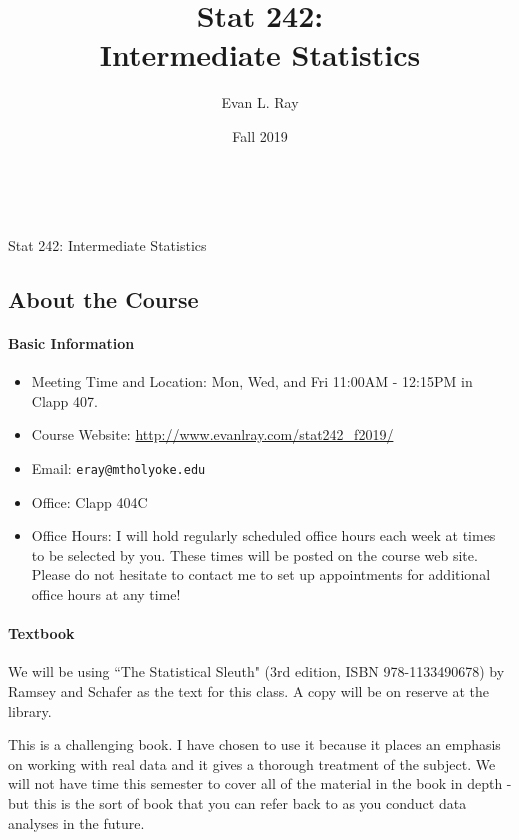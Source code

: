 \documentclass[11pt]{article}
\title{Stat 242:\\ Intermediate Statistics}
\author{Evan L. Ray}
\date{Fall 2019}
\begin{document}
	
	\ \\
	\vspace{.01in}
	\begin{center}
		{\large Stat 242: Intermediate Statistics}
	\end{center}
	\subsection*{About the Course}
	
	\paragraph{Basic Information}
	
	\begin{itemize}
		\item Meeting Time and Location: Mon, Wed, and Fri 11:00AM - 12:15PM in Clapp 407.
		\item Course Website: \url{http://www.evanlray.com/stat242_f2019/}
		\item Email: \texttt{eray@mtholyoke.edu}
		\item Office: Clapp 404C
		\item Office Hours: I will hold regularly scheduled office hours each week at times to be selected by you.  These times will be posted on the course web site.  Please do not hesitate to contact me to set up appointments for additional office hours at any time!
	\end{itemize}
	
	\paragraph{Textbook}
	
	We will be using ``The Statistical Sleuth" (3rd edition, ISBN 978-1133490678) by Ramsey and Schafer as the text for this class.  A copy will be on reserve at the library.
	
	This is a challenging book.  I have chosen to use it because it places an emphasis on working with real data and it gives a thorough treatment of the subject.  We will not have time this semester to cover all of the material in the book in depth - but this is the sort of book that you can refer back to as you conduct data analyses in the future.
	
\end{document}
